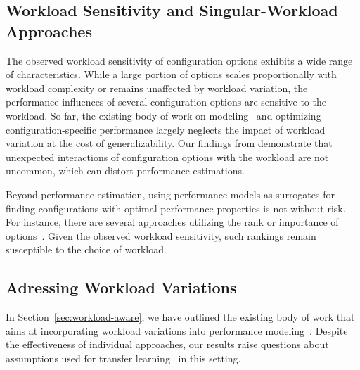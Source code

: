 {{{\subsection{Workload Sensitivity and Singular-Workload Approaches}
The observed workload sensitivity of configuration options exhibits a wide range of characteristics. While a large portion of options scales proportionally with workload complexity or remains unaffected by workload variation, the performance influences of several configuration options are sensitive to the workload.  So far, the existing body of work on modeling~\cite{dorn2020,siegmundPerformanceinfluenceModelsHighly2015,haDeepPerf2019,perfAL,guoVariabilityawarePerformancePrediction2013,sarkarCostEfficientSamplingPerformance,guo_2018_data,fourier_learning_2015,perLasso} and optimizing~\cite{chen_mmo_2021,nairUsingBadLearners2017,nairFlash18,ohFindingNearoptimalConfigurations2017} configuration-specific performance largely neglects the impact of workload variation at the cost of generalizability. 
Our findings from  demonstrate that unexpected interactions of configuration options with the workload are not uncommon, which can distort performance estimations.

Beyond performance estimation, using performance models as surrogates for finding configurations with optimal performance properties is not without risk. For instance, there are several approaches utilizing the rank or importance of options~\cite{nairUsingBadLearners2017,ohFindingNearoptimalConfigurations2017}. Given the observed workload sensitivity, such rankings remain susceptible to the choice of workload.

\subsection{Adressing Workload Variations}
In Section~\ref{sec:workload-aware}, we have outlined the existing body of work that aims at incorporating workload variations into performance modeling~\cite{koc_satune_2021,jamishidi_transfer_2017,jamshidi_learning_2018,jamshidi_transfer_gp_2017}. Despite the effectiveness of individual approaches, our results raise questions about assumptions  used for transfer learning~\cite{jamshidi_learning_2018,jamishidi_transfer_2017} in this setting. 

}}}

